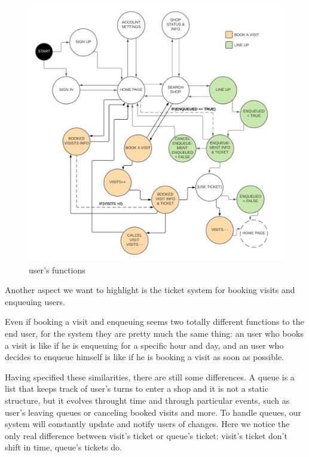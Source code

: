 \begin{figure}[h!]
    \centering
    \includegraphics[width=\textwidth]{Images/statediagrams/userfunctions.png}
    \caption{\label{fig:userfunctions}{user's functions}}
\end{figure}

\FloatBarrier

Another aspect we want to highlight is the ticket system for booking visits and enqueuing users.

Even if booking a visit and enqueuing seems two totally different functions to the end user, for the system they are pretty much the same thing: an user who books a visit is like if he is enqueuing for a specific hour and day, and an user who decides to enqueue himself is like if he is booking a visit as soon as possible. 

Having specified these similarities, there are still some differences. A queue is a list that keeps track of user's turns to enter a shop and it is not a static structure, but it evolves throught time and through particular events, such as user's leaving queues or canceling booked visits and more. 
To handle queues, our system will constantly update and notify users of changes. Here we notice the only real difference between visit's ticket or queue's ticket: visit's ticket don't shift in time, queue's tickets do.


